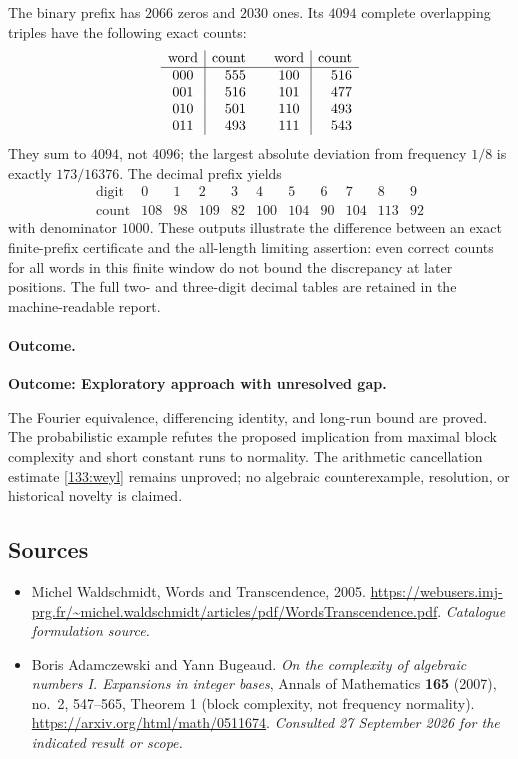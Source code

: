 \documentclass[11pt,a4paper]{article}
\numberwithin{equation}{section}
\begin{document}
The binary prefix has $2066$ zeros and $2030$ ones. Its $4094$
complete overlapping triples have the following exact counts:
\[
\begin{array}{c|r@{\qquad}c|r}
\text{word}&\text{count}&\text{word}&\text{count}\\\hline
000&555&100&516\\
001&516&101&477\\
010&501&110&493\\
011&493&111&543
\end{array}
\]
They sum to $4094$, not $4096$; the largest absolute deviation from
frequency $1/8$ is exactly $173/16376$. The decimal prefix yields
\[
\begin{array}{c|rrrrrrrrrr}
\text{digit}&0&1&2&3&4&5&6&7&8&9\\\hline
\text{count}&108&98&109&82&100&104&90&104&113&92
\end{array}
\]
with denominator $1000$. These outputs illustrate the difference
between an exact finite-prefix certificate and the all-length limiting
assertion: even correct counts for all words in this finite window do
not bound the discrepancy at later positions. The full two- and
three-digit decimal tables are retained in the machine-readable report.

\paragraph{Outcome.}
\textbf{Outcome: Exploratory approach with unresolved gap.}

The Fourier equivalence, differencing identity, and long-run bound are
proved.  The probabilistic example refutes the proposed implication
from maximal block complexity and short constant runs to normality.
The arithmetic cancellation estimate \eqref{133:weyl} remains unproved;
no algebraic counterexample, resolution, or historical novelty is claimed.
\subsection{Sources}
\begin{itemize}\raggedright
\item[\textnormal{[S1]}]\hypertarget{source:133:1}{} Michel Waldschmidt, Words and Transcendence, 2005.
\url{https://webusers.imj-prg.fr/~michel.waldschmidt/articles/pdf/WordsTranscendence.pdf}.
{\small\textit{Catalogue formulation source.}}
\item[\textnormal{[E1]}]\hypertarget{extra:133:1}{} Boris Adamczewski and Yann Bugeaud.
\emph{On the complexity of algebraic numbers I. Expansions in integer bases}, Annals of Mathematics \textbf{165} (2007), no.~2, 547--565, Theorem 1 (block complexity, not frequency normality).
\url{https://arxiv.org/html/math/0511674}.
{\small\textit{Consulted 27 September 2026 for the indicated result or scope.}}
\end{itemize}
\end{document}
